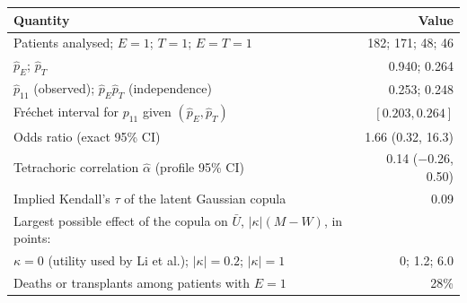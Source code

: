 \small
\begin{tabular}{@{}lr@{}}
\toprule
Quantity & Value\\
\midrule
Patients analysed; $E=1$; $T=1$; $E=T=1$ & 182; 171; 48; 46\\
$\hat p_E$; $\hat p_T$ & 0.940; 0.264\\
$\hat p_{11}$ (observed); $\hat p_E\hat p_T$ (independence) & 0.253; 0.248\\
Fr\'echet interval for $p_{11}$ given $(\hat p_E,\hat p_T)$ & $[0.203, 0.264]$\\
Odds ratio (exact 95\% CI) & 1.66 (0.32, 16.3)\\
Tetrachoric correlation $\hat\alpha$ (profile 95\% CI) & 0.14 (\ensuremath{-}0.26, 0.50)\\
Implied Kendall's $\tau$ of the latent Gaussian copula & 0.09\\
Largest possible effect of the copula on $\bar U$, $|\kappa|(M-W)$, in points: & \\
\quad $\kappa=0$ (utility used by Li et al.); $|\kappa|=0.2$; $|\kappa|=1$ & 0; 1.2; 6.0\\
Deaths or transplants among patients with $E=1$ & 28\%\\
\bottomrule
\end{tabular}
